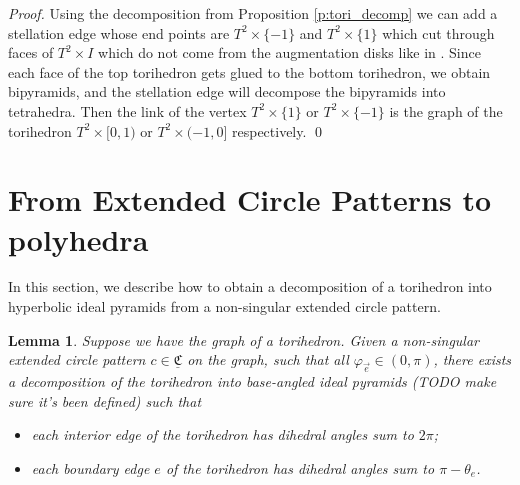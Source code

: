 \documentclass[11pt]{amsart}
\newcommand{\CCC}{{\underline{\mathfrak{C}}}}
\newcommand{\vphi}{\varphi}
\theoremstyle{plain}
\newtheorem{lemma}[theorem]{Lemma}
\theoremstyle{definition}
\begin{document}
{\it Proof.}  Using the decomposition from Proposition
\ref{p:tori_decomp} we can add a stellation edge whose end points
are $T^2 \times \{-1\}$ and $T^2 \times \{1\}$ which cut through faces of $T^2
\times I$ which do not come from the augmentation disks like in \cite{CKP2}.
Since each face of the top torihedron gets glued to the bottom torihedron, we
obtain bipyramids, and the stellation edge will decompose the bipyramids into
tetrahedra. Then the link of the vertex  $T^2 \times \{1\}$ or $T^2 \times
\{-1\}$ is the graph of the torihedron $T^2 \times [0,1)$ or $T^2 \times (-1,0]$
respectively. \qed



\section{From Extended Circle Patterns to polyhedra}

In this section, we describe how to obtain a
decomposition of a torihedron
into hyperbolic ideal pyramids
from a non-singular extended circle pattern.

\begin{lemma}
\label{l:circpattern_polyhedra}
Suppose we have the graph of a torihedron.
Given a non-singular extended circle pattern $c \in \CCC$ on the graph,
such that all $\vphi_{\vec{e}} \in (0,\pi)$,
there exists a decomposition of the torihedron
into base-angled ideal pyramids (TODO make sure it's been defined) such that
	\begin{itemize}
		\item each interior edge of the torihedron has dihedral angles sum to $2\pi$;
		\item each boundary edge $e$ of the torihedron has dihedral angles sum to
			$\pi - \theta_e$.
	\end{itemize}
\end{lemma}
\end{document}
